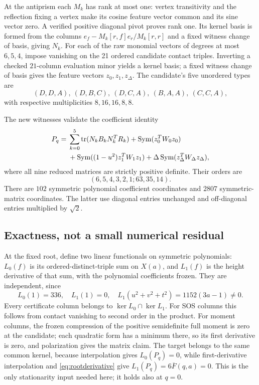 \documentclass[11pt,reqno]{amsart}
\theoremstyle{remark}\newtheorem{remark}[theorem]{Remark}
\newcommand{\Sym}{\operatorname{Sym}}
\newcommand{\tr}{\operatorname{tr}}
\numberwithin{equation}{section}
\begin{document}
At the antiprism each $M_k$ has rank at most one: vertex transitivity and
the reflection fixing a vertex make its cosine feature vector common and
its sine vector zero. A verified positive diagonal pivot proves rank one.
Its kernel basis is formed from the columns
$e_f-M_k[r,f]e_r/M_k[r,r]$ and a fixed witness change of basis, giving $N_k$.
For each of the raw monomial vectors of degrees at most $6,5,4$, impose
vanishing on the 21 ordered candidate contact triples. Inverting a checked
$21$-column evaluation minor yields a kernel basis; a fixed witness change
of basis gives the feature vectors $z_0,z_1,z_\Delta$. The candidate's five
unordered types are
\[
 (D,D,A),\ (D,B,C),\ (D,C,A),\ (B,A,A),\ (C,C,A),
\]
with respective multiplicities $8,16,16,8,8$.

The new witnesses validate the coefficient identity
\begin{align}\label{eq:certificate}
 P_q={}&\sum_{k=0}^5\tr(N_kB_kN_k^TR_k)
       +\Sym(z_0^TW_0z_0)\notag\\
     &+\Sym((1-u^2)z_1^TW_1z_1)
       +\Delta\Sym(z_\Delta^TW_\Delta z_\Delta),
\end{align}
where all nine reduced matrices are strictly positive definite.
Their orders are
\[
 (6,5,4,3,2,1;63,35,14).
\]
There are $102$ symmetric polynomial coefficient coordinates and $2807$
symmetric-matrix coordinates. The latter use diagonal entries unchanged
and off-diagonal entries multiplied by $\sqrt2$.

\subsection{Exactness, not a small numerical residual}
At the fixed root, define two linear functionals on symmetric polynomials:
$L_0(f)$ is its ordered-distinct-triple sum on $X(a)$, and $L_1(f)$ is the
height derivative of that sum, with the polynomial coefficients frozen.
They are independent, since
\[
 L_0(1)=336,\quad L_1(1)=0,\quad
 L_1(u^2+v^2+t^2)=1152(3a-1)\ne0.
\]
Every certificate column belongs to $\ker L_0\cap\ker L_1$. For SOS columns
this follows from contact vanishing to second order in the product. For
moment columns, the frozen compression of the positive semidefinite full
moment is zero at the candidate; each quadratic form has a minimum there,
so its first derivative is zero, and polarization gives the matrix claim.
The target belongs to the same common kernel, because interpolation gives
$L_0(P_q)=0$, while first-derivative interpolation and
\eqref{eq:rootderivative} give $L_1(P_q)=6\overline F(q,a)=0$.
This is the only stationarity input needed here; it holds also at $q=0$.
\end{document}
